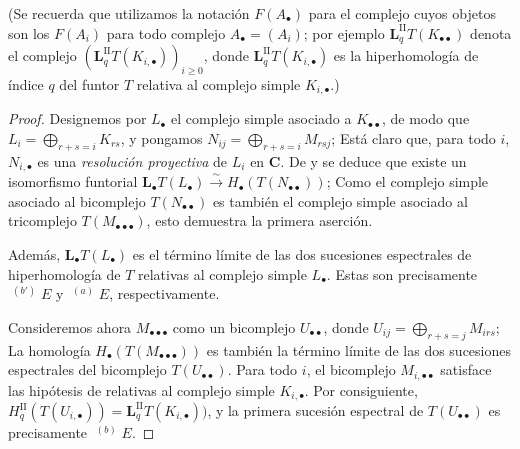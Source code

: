 \documentclass[10pt,oneside,openany]{book}
\theoremstyle{egaenv}\newtheorem*{env}{---}
\theoremstyle{egastatement}
\theoremstyle{egadescription}
\renewcommand{\geq}{\geqslant}
\begin{document}
(Se recuerda que utilizamos la notación $F(A_\bullet)$ para el complejo cuyos objetos son los $F(A_i)$ para todo complejo $A_\bullet=(A_i)$; por ejemplo $\mathbf{L}_q^{\mathrm{II}}T(K_{\bullet\bullet})$ denota el complejo
$(\mathbf{L}_q^{\mathrm{II}}T(K_{i,\bullet}))_{i\geq0}$,
donde $\mathbf{L}_q^{\mathrm{II}}T(K_{i,\bullet})$ es la hiperhomología de índice
$q$ del funtor $T$ relativa al complejo simple $K_{i,\bullet}$.)

\begin{proof}
Designemos por $L_\bullet$ el complejo simple asociado a
$K_{\bullet\bullet}$, de modo que
$L_i=\bigoplus_{r+s=i}K_{rs}$,
y pongamos
$N_{ij}=\bigoplus_{r+s=i}M_{rsj}$;
Está claro que, para todo $i$, $N_{i,\bullet}$ es una \emph{resolución proyectiva}
de $L_i$ en $\boldsymbol{C}$.
De  y  se deduce que existe un
isomorfismo funtorial
$
\mathbf{L}_\bullet T(L_\bullet)\xrightarrow{\sim} H_\bullet(T(N_{\bullet\bullet}))$;
Como el complejo simple asociado al bicomplejo
$T(N_{\bullet\bullet})$ es también el complejo simple asociado al
tricomplejo $T(M_{\bullet\bullet\bullet})$, esto demuestra la primera aserción.

Además, $\mathbf{L}_\bullet T(L_\bullet)$ es el término límite de las dos
sucesiones espectrales de hiperhomología  de $T$ relativas al
complejo simple $L_\bullet$.
Estas son precisamente $\mathop{}^{(b')}E$ y $\mathop{}^{(a)}E$,
respectivamente.

Consideremos ahora $M_{\bullet\bullet\bullet}$ como un bicomplejo
$U_{\bullet\bullet}$, donde
$U_{ij}=\bigoplus_{r+s=j}M_{irs}$;
La homología $H_\bullet(T(M_{\bullet\bullet\bullet}))$ es también la
término límite de las dos sucesiones espectrales del bicomplejo
$T(U_{\bullet\bullet})$.
Para todo $i$, el bicomplejo $M_{i,\bullet\bullet}$ satisface las
hipótesis de  relativas al complejo simple
$K_{i,\bullet}$.
Por consiguiente,
$H_q^{\mathrm{II}}(T(U_{i,\bullet}))=
\mathbf{L}_q^{\mathrm{II}}T(K_{i,\bullet}))$,
y la primera sucesión espectral de $T(U_{\bullet\bullet})$ es precisamente
$\mathop{}^{(b)}E$.


\end{proof}
\end{document}
